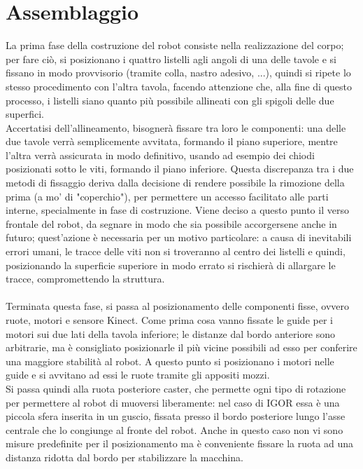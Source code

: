 \documentclass[Lau]{sapthesis}
\begin{document}
\section{Assemblaggio}
La prima fase della costruzione del robot consiste nella realizzazione del corpo; per fare ciò, si posizionano i quattro listelli agli angoli di una delle tavole e si fissano in modo provvisorio (tramite colla, nastro adesivo, ...), quindi si ripete lo stesso procedimento con l'altra tavola, facendo attenzione che, alla fine di questo processo, i listelli siano quanto più possibile allineati con gli spigoli delle due superfici.\\
Accertatisi dell'allineamento, bisognerà fissare tra loro le componenti: una delle due tavole verrà semplicemente avvitata, formando il piano superiore, mentre l'altra verrà assicurata in modo definitivo, usando ad esempio dei chiodi posizionati sotto le viti, formando il piano inferiore. Questa discrepanza tra i due metodi di fissaggio deriva dalla decisione di rendere possibile la rimozione della prima (a mo' di "coperchio"), per permettere un accesso facilitato alle parti interne, specialmente in fase di costruzione. Viene deciso a questo punto il verso frontale del robot, da segnare in modo che sia possibile accorgersene anche in futuro; quest'azione è necessaria per un motivo particolare: a causa di inevitabili errori umani, le tracce delle viti non si troveranno al centro dei listelli e quindi, posizionando la superficie superiore in modo errato si rischierà di allargare le tracce, compromettendo la struttura.\\\\
Terminata questa fase, si passa al posizionamento delle componenti fisse, ovvero ruote, motori e sensore Kinect. Come prima cosa vanno fissate le guide per i motori sui due lati della tavola inferiore; le distanze dal bordo anteriore sono arbitrarie, ma è consigliato posizionarle il più vicine possibili ad esso per conferire una maggiore stabilità al robot. A questo punto si posizionano i motori nelle guide e si avvitano ad essi le ruote tramite gli appositi mozzi.\\
Si passa quindi alla ruota posteriore caster, che permette ogni tipo di rotazione per permettere al robot di muoversi liberamente: nel caso di \textcolor{sapred}{IGOR} essa è una piccola sfera inserita in un guscio, fissata presso il bordo posteriore lungo l'asse centrale che lo congiunge al fronte del robot. Anche in questo caso non vi sono misure predefinite per il posizionamento ma è conveniente fissare la ruota ad una distanza ridotta dal bordo per stabilizzare la macchina.\\
\end{document}
